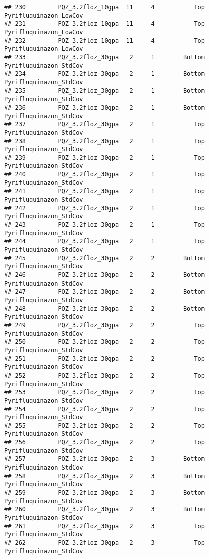 \documentclass[
]{article}
\begin{document}
\begin{verbatim}
## 230         PQZ_3.2floz_10gpa  11     4           Top Pyrifluquinazon_LowCov
## 231         PQZ_3.2floz_10gpa  11     4           Top Pyrifluquinazon_LowCov
## 232         PQZ_3.2floz_10gpa  11     4           Top Pyrifluquinazon_LowCov
## 233         PQZ_3.2floz_30gpa   2     1        Bottom Pyrifluquinazon_StdCov
## 234         PQZ_3.2floz_30gpa   2     1        Bottom Pyrifluquinazon_StdCov
## 235         PQZ_3.2floz_30gpa   2     1        Bottom Pyrifluquinazon_StdCov
## 236         PQZ_3.2floz_30gpa   2     1        Bottom Pyrifluquinazon_StdCov
## 237         PQZ_3.2floz_30gpa   2     1           Top Pyrifluquinazon_StdCov
## 238         PQZ_3.2floz_30gpa   2     1           Top Pyrifluquinazon_StdCov
## 239         PQZ_3.2floz_30gpa   2     1           Top Pyrifluquinazon_StdCov
## 240         PQZ_3.2floz_30gpa   2     1           Top Pyrifluquinazon_StdCov
## 241         PQZ_3.2floz_30gpa   2     1           Top Pyrifluquinazon_StdCov
## 242         PQZ_3.2floz_30gpa   2     1           Top Pyrifluquinazon_StdCov
## 243         PQZ_3.2floz_30gpa   2     1           Top Pyrifluquinazon_StdCov
## 244         PQZ_3.2floz_30gpa   2     1           Top Pyrifluquinazon_StdCov
## 245         PQZ_3.2floz_30gpa   2     2        Bottom Pyrifluquinazon_StdCov
## 246         PQZ_3.2floz_30gpa   2     2        Bottom Pyrifluquinazon_StdCov
## 247         PQZ_3.2floz_30gpa   2     2        Bottom Pyrifluquinazon_StdCov
## 248         PQZ_3.2floz_30gpa   2     2        Bottom Pyrifluquinazon_StdCov
## 249         PQZ_3.2floz_30gpa   2     2           Top Pyrifluquinazon_StdCov
## 250         PQZ_3.2floz_30gpa   2     2           Top Pyrifluquinazon_StdCov
## 251         PQZ_3.2floz_30gpa   2     2           Top Pyrifluquinazon_StdCov
## 252         PQZ_3.2floz_30gpa   2     2           Top Pyrifluquinazon_StdCov
## 253         PQZ_3.2floz_30gpa   2     2           Top Pyrifluquinazon_StdCov
## 254         PQZ_3.2floz_30gpa   2     2           Top Pyrifluquinazon_StdCov
## 255         PQZ_3.2floz_30gpa   2     2           Top Pyrifluquinazon_StdCov
## 256         PQZ_3.2floz_30gpa   2     2           Top Pyrifluquinazon_StdCov
## 257         PQZ_3.2floz_30gpa   2     3        Bottom Pyrifluquinazon_StdCov
## 258         PQZ_3.2floz_30gpa   2     3        Bottom Pyrifluquinazon_StdCov
## 259         PQZ_3.2floz_30gpa   2     3        Bottom Pyrifluquinazon_StdCov
## 260         PQZ_3.2floz_30gpa   2     3        Bottom Pyrifluquinazon_StdCov
## 261         PQZ_3.2floz_30gpa   2     3           Top Pyrifluquinazon_StdCov
## 262         PQZ_3.2floz_30gpa   2     3           Top Pyrifluquinazon_StdCov

\end{verbatim}
\end{document}
